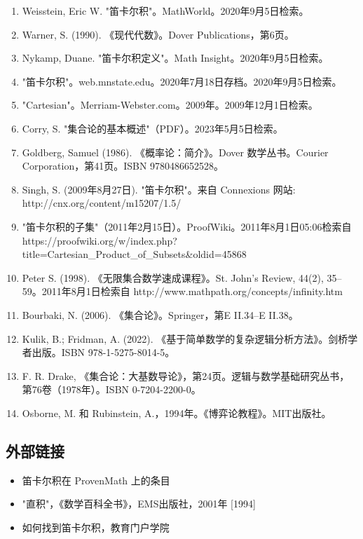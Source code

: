 \begin{enumerate}
\item Weisstein, Eric W. "笛卡尔积"。MathWorld。2020年9月5日检索。
\item Warner, S. (1990). 《现代代数》。Dover Publications，第6页。
\item Nykamp, Duane. "笛卡尔积定义"。Math Insight。2020年9月5日检索。
\item "笛卡尔积"。web.mnstate.edu。2020年7月18日存档。2020年9月5日检索。
\item "Cartesian"。Merriam-Webster.com。2009年。2009年12月1日检索。
\item Corry, S. "集合论的基本概述"（PDF）。2023年5月5日检索。
\item Goldberg, Samuel (1986). 《概率论：简介》。Dover 数学丛书。Courier Corporation，第41页。ISBN 9780486652528。
\item Singh, S. (2009年8月27日). "笛卡尔积"。来自 Connexions 网站: http://cnx.org/content/m15207/1.5/
\item "笛卡尔积的子集"（2011年2月15日）。ProofWiki。2011年8月1日05:06检索自 https://proofwiki.org/w/index.php?title=Cartesian_Product_of_Subsets&oldid=45868
\item Peter S. (1998). 《无限集合数学速成课程》。St. John's Review, 44(2), 35–59。2011年8月1日检索自 http://www.mathpath.org/concepts/infinity.htm
\item Bourbaki, N. (2006). 《集合论》。Springer，第E II.34–E II.38。
\item Kulik, B.; Fridman, A. (2022). 《基于简单数学的复杂逻辑分析方法》。剑桥学者出版。ISBN 978-1-5275-8014-5。
\item F. R. Drake, 《集合论：大基数导论》，第24页。逻辑与数学基础研究丛书，第76卷（1978年）。ISBN 0-7204-2200-0。
\item Osborne, M. 和 Rubinstein, A.，1994年。《博弈论教程》。MIT出版社。
\end{enumerate}
\subsection{外部链接}
\begin{itemize}
\item 笛卡尔积在 ProvenMath 上的条目
\item "直积"，《数学百科全书》，EMS出版社，2001年 [1994]
\item 如何找到笛卡尔积，教育门户学院
\end{itemize}